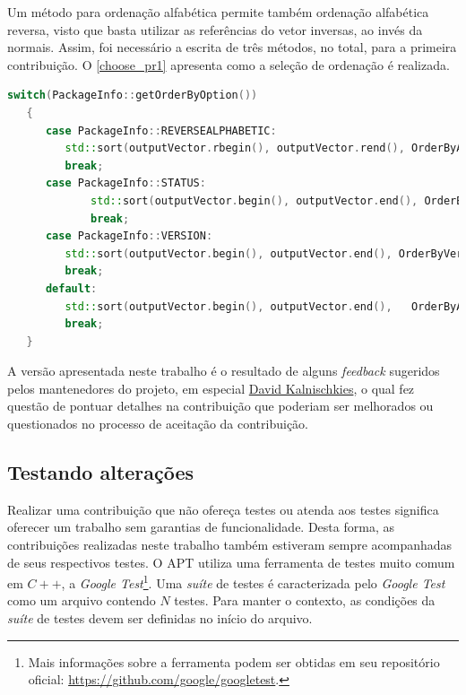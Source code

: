 Um método para ordenação alfabética permite também ordenação alfabética reversa, visto que basta utilizar as referências do vetor inversas, ao invés da normais. Assim, foi necessário a escrita de três métodos, no total, para a primeira contribuição. O \autoref{choose_pr1} apresenta como a seleção de ordenação é realizada.


\begin{lstlisting}[language=C++,label=choose_pr1,caption={Tomada de decisão de ordenação}]
   switch(PackageInfo::getOrderByOption())
   {
      case PackageInfo::REVERSEALPHABETIC:
		 std::sort(outputVector.rbegin(), outputVector.rend(), OrderByAlphabetic);
		 break;
      case PackageInfo::STATUS:
			 std::sort(outputVector.begin(), outputVector.end(), OrderByStatus);
			 break;
      case PackageInfo::VERSION:
		 std::sort(outputVector.begin(), outputVector.end(), OrderByVersion);
		 break;
      default:
		 std::sort(outputVector.begin(), outputVector.end(),   OrderByAlphabetic);
		 break;
   }
\end{lstlisting}

A versão apresentada neste trabalho é o resultado de alguns \textit{feedback} sugeridos pelos mantenedores do projeto, em especial \href{https://github.com/DonKult}{David Kalnischkies}, o qual fez questão de pontuar detalhes na contribuição que poderiam ser melhorados ou questionados no processo de aceitação da contribuição.


\subsection*{Testando alterações} %

Realizar uma contribuição que não ofereça testes ou atenda aos testes significa oferecer um trabalho sem garantias de funcionalidade. Desta forma, as contribuições realizadas neste trabalho também estiveram sempre acompanhadas de seus respectivos testes. O {\code APT} utiliza uma ferramenta de testes muito comum em $C++$, a \textit{Google Test}\footnote{Mais informações sobre a ferramenta podem ser obtidas em seu repositório oficial: \url{https://github.com/google/googletest}.}. Uma \textit{suíte} de testes é caracterizada pelo \textit{Google Test} como um arquivo contendo $N$ testes. Para manter o contexto, as condições da \textit{suíte} de testes devem ser definidas no início do arquivo.

